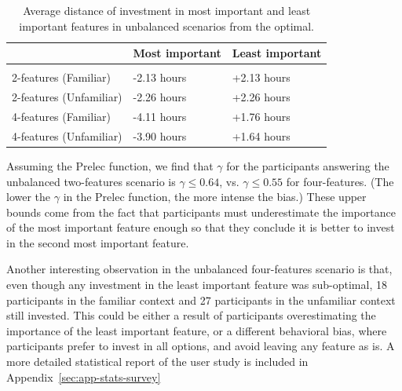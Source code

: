 \begin{table}[ht]
    \caption{Average distance of investment in most important and least important features in unbalanced scenarios from the optimal.}\label{table:avg-dist-from-opt}
    \begin{center}
        \begin{tabular}{lll}
         &\textbf{Most important} &\textbf{Least important} \\
        \hline \\[-4.8pt]
        2-features (Familiar) & -2.13 hours & +2.13 hours \\
        2-features (Unfamiliar) & -2.26 hours & +2.26 hours \\
        4-features (Familiar) & -4.11 hours & +1.76 hours \\
        4-features (Unfamiliar) & -3.90 hours & +1.64 hours
        \end{tabular}
    \end{center}
\end{table}
Assuming the Prelec function, we find that $\gamma$ for the participants answering the unbalanced two-features scenario is $\gamma \le 0.64$, vs. $\gamma\le 0.55$ for four-features. (The lower the $\gamma$ in the Prelec function, the more intense the bias.) These upper bounds come from the fact that participants must underestimate the importance of the most important feature enough so that they conclude it is better to invest in the second most important feature.  

Another interesting observation in the unbalanced four-features scenario is that, even though any investment in the least important feature was sub-optimal, 18 participants in the familiar context and 27 participants in the unfamiliar context still invested. This could be either a result of participants overestimating the importance of the least important feature, or a different behavioral bias, where participants prefer to invest in all options, and avoid leaving any feature as is. {A more detailed statistical report of the user study is included in Appendix~\ref{sec:app-stats-survey}}
